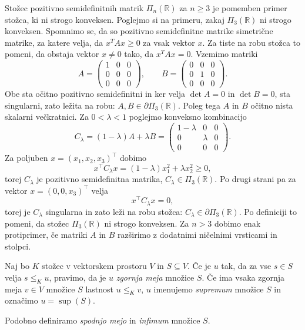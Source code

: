 \documentclass[mat2, tisk]{fmfdelo}
\begin{document}
\begin{zgled}
  Stožec pozitivno semidefinitnih matrik $\Pi_n(\mathbb{R})$ za $n\ge 3$ je
  pomemben primer stožca, ki ni strogo konveksen. Poglejmo si na primeru, zakaj $\Pi_3(\mathbb{R})$ ni strogo konveksen.
  Spomnimo se, da so pozitivno semidefinitne matrike simetrične matrike, za katere velja, da $x^T A x \ge 0$ za vsak vektor $x$.
  Za tiste na robu stožca to pomeni, da obstaja vektor $x \neq 0$ tako, da $x^T A x = 0$.
  Vzemimo matriki
  \[
  A =
  \begin{pmatrix}
  1 & 0 & 0\\
  0 & 0 & 0\\
  0 & 0 & 0
  \end{pmatrix},
  \qquad
  B =
  \begin{pmatrix}
  0 & 0 & 0\\
  0 & 1 & 0\\
  0 & 0 & 0
  \end{pmatrix}.
  \]
  Obe sta očitno pozitivno semidefinitni in ker velja
  $\det A = 0$ in $\det B = 0$,
  sta singularni, zato ležita na robu:
  $A,B \in \partial \Pi_3(\mathbb{R})$.
  Poleg tega $A$ in $B$ očitno nista skalarni večkratnici.
  Za $0<\lambda<1$ poglejmo konveksno kombinacijo
  \[
  C_\lambda = (1-\lambda)A + \lambda B
  =
  \begin{pmatrix}
  1-\lambda & 0 & 0\\
  0 & \lambda & 0\\
  0 & 0 & 0
  \end{pmatrix}.
  \]
  Za poljuben $x = (x_1,x_2,x_3)^\top$ dobimo
  \[
  x^\top C_\lambda x
  = (1-\lambda)x_1^2 + \lambda x_2^2 \ge 0,
  \]
  torej $C_\lambda$ je pozitivno semidefinitna matrika, $C_\lambda \in \Pi_3(\mathbb{R})$.  
  Po drugi strani pa za vektor $x = (0,0,x_3)^\top$ velja
  \[
  x^\top C_\lambda x = 0,
  \]
  torej je $C_\lambda$ singularna in zato leži na robu stožca: $C_\lambda \in \partial \Pi_3(\mathbb{R})$.
  Po definiciji to pomeni, da stožec $\Pi_3(\mathbb{R})$ ni strogo konveksen.
  Za $n>3$ dobimo enak protiprimer, če matriki
  $A$ in $B$ razširimo z dodatnimi ničelnimi vrsticami
  in stolpci.
\end{zgled}

\begin{definicija}
  Naj bo $K$ stožec v vektorskem prostoru $V$ in $S\subseteq V$. Če je $u$ tak, da za vse $s\in S$ velja $s\le_K u$, 
  pravimo, da je $u$ \emph{zgornja meja} množice $S$. 
  Če ima vsaka zgornja meja $v \in V$ množice $S$ lastnost $u\le_K v$, $u$ imenujemo \emph{supremum} množice $S$ in
  označimo $u=\sup(S)$.

  Podobno definiramo \emph{spodnjo mejo} in \emph{infimum} množice $S$.
\end{definicija}
\end{document}
